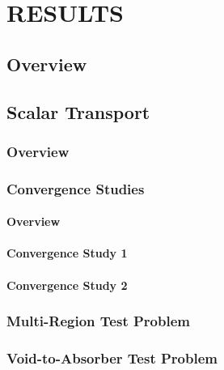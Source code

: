 \chapter{RESULTS}

\section{Overview}
  
\section{Scalar Transport\label{sec:transport_results}}
\subsection{Overview}
  
\subsection{Convergence Studies\label{sec:convergence}}
  \subsubsection{Overview\label{sec:convergence_overview}}
    
  \subsubsection{Convergence Study 1\label{sec:mms_sinx_ss}}
    
  \subsubsection{Convergence Study 2\label{sec:absorber_ss}}
    
\subsection{Multi-Region Test Problem\label{sec:multi_region}}
  
\subsection{Void-to-Absorber Test Problem\label{sec:void_to_absorber}}
  
